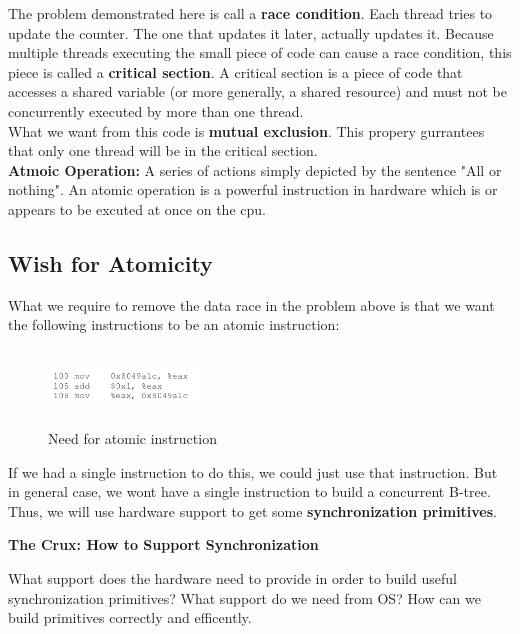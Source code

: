 The problem demonstrated here is call a \textbf{race condition}. Each thread
tries to update the counter. The one that updates it later, actually updates it.
Because multiple threads executing the small piece of code can cause a race
condition, this piece is called a \textbf{critical section}. A critical section
is a piece of code that accesses a shared variable (or more generally, 
a shared resource) and must not be concurrently executed by more than one
thread.\\

What we want from this code is \textbf{mutual exclusion}. This propery 
gurrantees that only one thread will be in the critical section.\\

\textbf{Atmoic Operation:} A series of actions simply depicted by the 
sentence "All or nothing". An atomic operation is a powerful instruction in 
hardware which is or appears to be excuted at once on the cpu.\\

\subsection{Wish for Atomicity}

What we require to remove the data race in the problem above is that we want
the following instructions to be an atomic instruction:

\begin{figure}[h!]
    \begin{center}
        \includegraphics[width=4cm, height=2cm]{img/atomicex.png}
        \caption{Need for atomic instruction}
    \end{center}
\end{figure}

If we had a single instruction to do this, we could just use that instruction.
But in general case, we wont have a single instruction to build a concurrent
B-tree. Thus, we will use hardware support to get some \textbf{synchronization
primitives}.

\begin{tcolorbox}
    \begin{center}
        \textbf{The Crux: How to Support Synchronization}
    \end{center}  

    What support does the hardware need to provide in order to build useful
    synchronization primitives? What support do we need from OS? How can we
    build primitives correctly and efficently.
\end{tcolorbox}

